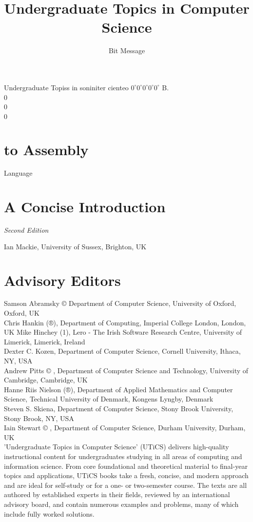 \documentclass[10pt]{book}
\title{\textbf{Undergraduate Topics in Computer Science}}
\author{Bit Message}
\date{}
\begin{document}
\frontmatter
\maketitle
\tableofcontents

Undergraduate Topiss in soniniter cienteo $0^{\circ} 0^{\circ} 0^{\circ} 0^{\circ} 0^{\circ}$ B.\\
0\\
0\\
0

\section{to Assembly}
Language
\section{A Concise Introduction}
\textit{Second Edition}

Ian Mackie, University of Sussex, Brighton, UK

\section{Advisory Editors}
Samson Abramsky © Department of Computer Science, University of Oxford, Oxford, UK\\
Chris Hankin (®), Department of Computing, Imperial College London, London, UK Mike Hinchey (1), Lero - The Irish Software Research Centre, University of Limerick, Limerick, Ireland\\
Dexter C. Kozen, Department of Computer Science, Cornell University, Ithaca, NY, USA\\
Andrew Pitts © , Department of Computer Science and Technology, University of Cambridge, Cambridge, UK\\
Hanne Riis Nielson (®), Department of Applied Mathematics and Computer Science, Technical University of Denmark, Kongens Lyngby, Denmark\\
Steven S. Skiena, Department of Computer Science, Stony Brook University, Stony Brook, NY, USA\\
Iain Stewart © , Department of Computer Science, Durham University, Durham, UK\\

'Undergraduate Topics in Computer Science' (UTiCS) delivers high-quality instructional content for undergraduates studying in all areas of computing and information science. From core foundational and theoretical material to final-year topics and applications, UTiCS books take a fresh, concise, and modern approach and are ideal for self-study or for a one- or two-semester course. The texts are all authored by established experts in their fields, reviewed by an international advisory board, and contain numerous examples and problems, many of which include fully worked solutions.
\end{document}
